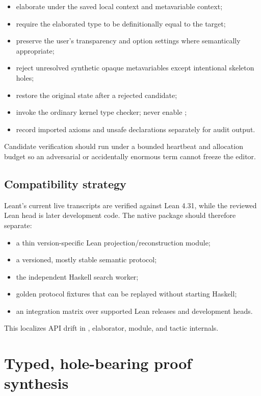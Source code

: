 \documentclass[11pt,letterpaper,openany]{report}
\newcommand{\code}[1]{\texttt{\detokenize{#1}}}
\begin{document}
\begin{itemize}
  \item elaborate under the saved local context and metavariable context;
  \item require the elaborated type to be definitionally equal to the target;
  \item preserve the user's transparency and option settings where semantically
        appropriate;
  \item reject unresolved synthetic opaque metavariables except intentional skeleton
        holes;
  \item restore the original state after a rejected candidate;
  \item invoke the ordinary kernel type checker; never enable
        \code{debug.skipKernelTC};
  \item record imported axioms and unsafe declarations separately for audit output.
\end{itemize}

Candidate verification should run under a bounded heartbeat and allocation budget so
an adversarial or accidentally enormous term cannot freeze the editor.

\section{Compatibility strategy}

Leant's current live transcripts are verified against Lean 4.31, while the reviewed
Lean head is later development code. The native package should therefore separate:

\begin{itemize}
  \item a thin version-specific Lean projection/reconstruction module;
  \item a versioned, mostly stable semantic protocol;
  \item the independent Haskell search worker;
  \item golden protocol fixtures that can be replayed without starting Haskell;
  \item an integration matrix over supported Lean releases and development heads.
\end{itemize}

This localizes API drift in \code{Expr}, elaborator, module, and tactic internals.

\chapter{Typed, hole-bearing proof synthesis}
\label{ch:skeletons}
\end{document}

